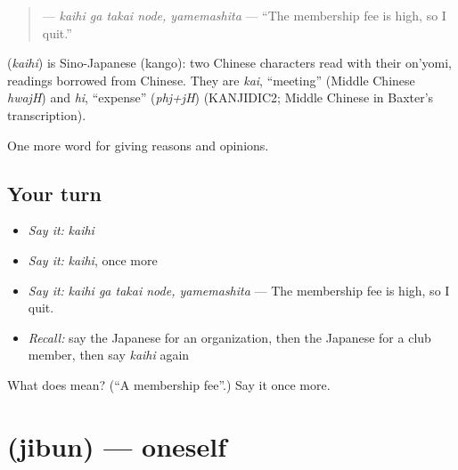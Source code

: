 \begin{quote}
\textbf{ } — \emph{kaihi ga takai node, yamemashita} — \textquotedblleft{}The membership fee is high, so I quit.\textquotedblright{}
\end{quote}

\begin{cousinweb}
\textbf{} (\emph{kaihi}) is Sino-Japanese (kango): two Chinese characters read with their on'yomi, readings borrowed from Chinese. They are \emph{kai}, \textquotedblleft{}meeting\textquotedblright{} (Middle Chinese \emph{hwajH}) and \emph{hi}, \textquotedblleft{}expense\textquotedblright{} (\emph{phj+jH}) (KANJIDIC2; Middle Chinese in Baxter's transcription).
\end{cousinweb}

\begin{grammarlens}[title={What you've built}]
One more word for giving reasons and opinions.
\end{grammarlens}

\subsection*{Your turn}
\begin{itemize}
\raggedright
  \item \emph{Say it:} \emph{kaihi}
  \item \emph{Say it:} \emph{kaihi}, once more
  \item \emph{Say it:} \emph{kaihi ga takai node, yamemashita} — The membership fee is high, so I quit.
  \item \emph{Recall:} say the Japanese for an organization, then the Japanese for a club member, then say \emph{kaihi} again
\end{itemize}

\begin{tcolorbox}[breakable,colback=teal!4,colframe=teal!35!black,title={Before you move on}]
What does  mean? (\textquotedblleft{}A membership fee\textquotedblright{}.) Say it once more.
\end{tcolorbox}
\section[\texorpdfstring{\ja{じぶん} (jibun)}{じぶん (jibun)}]{ (jibun) — oneself}

\label{lesson:JA-C335-jibun}




